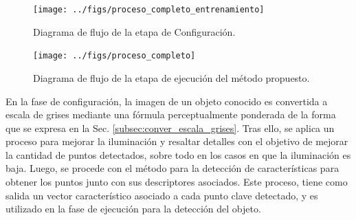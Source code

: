 \begin{figure}[tbhp]
   \centering
        \texttt{[image: ../figs/proceso\_completo\_entrenamiento]}
    \caption[Diagrama de flujo de la etapa de configuración]{Diagrama de flujo de la etapa de Configuración.}
   \label{fig:diagrama_metodo_entrenamiento}                %
\end{figure}
\begin{figure}[tbhp]
   \centering
        \texttt{[image: ../figs/proceso\_completo]}
    \caption[Diagrama de flujo de la etapa de ejecución]{Diagrama de flujo de la etapa de ejecución del método propuesto.}
   \label{fig:diagrama_metodo}                %
\end{figure}

En la fase de configuración, la imagen de un objeto conocido es convertida a escala de grises mediante una fórmula perceptualmente ponderada de la forma que se expresa en la Sec. \ref{subsec:conver_escala_grises}. Tras ello, se aplica un proceso para mejorar la iluminación y resaltar detalles con el objetivo de mejorar la cantidad de puntos detectados, sobre todo en los casos en que la iluminación es baja. Luego, se procede con el método para la detección de características para obtener los puntos junto con sus descriptores asociados. Este proceso, tiene como salida un vector característico asociado a cada punto clave detectado, y es utilizado en la fase de ejecución para la detección del objeto.

